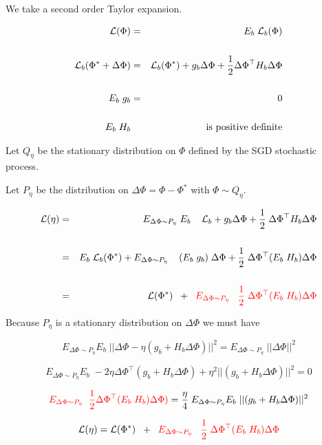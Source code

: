 {\vfill
We take a second order Taylor expansion.

\begin{eqnarray*}
{\cal L}(\Phi) & = & E_b\;{\cal L}_b(\Phi) \\
\\
{\cal L}_b(\Phi^* + \Delta \Phi) & = & {\cal L}_b(\Phi^*) + g_b \Delta \Phi + \frac{1}{2} \Delta\Phi^\top H_b \Delta\Phi \\
\\
E_b\; g_b & = & 0\\
\\
E_b\; H_b & & \mbox{is positive definite}
\end{eqnarray*}


Let $Q_\eta$ be the stationary distribution on $\Phi$ defined by the SGD stochastic process.

\vfill
Let $P_\eta$ be the distribution on $\Delta\Phi = \Phi - \Phi^*$ with $\Phi \sim Q_\eta$.

\begin{eqnarray*}
{\cal L}(\eta) & = & \;\;\; E_{\Delta \Phi \sim P_\eta}\;E_b \;\;\;\; {\cal L}_b + g_b\Delta \Phi + \frac{1}{2}\;\Delta \Phi^\top H_b \Delta \Phi \\
\\
& = & E_b\; {\cal L}_b(\Phi^*) + E_{\Delta \Phi \sim P_\eta} \;\;\;\;(E_b\;g_b) \;\Delta \Phi + \frac{1}{2}\;\Delta \Phi^\top (E_b\; H_b) \Delta \Phi \\
\\
& = & {\cal L}(\Phi^*)\;\; + \;\; {\color{red} E_{\Delta \Phi \sim P_\eta}\;\;\;\frac{1}{2}\;\Delta \Phi^\top (E_b\;H_b) \Delta \Phi}
\end{eqnarray*}

Because $P_\eta$ is a stationary distribution on $\Delta \Phi$ we must have

$$E_{\Delta \Phi \sim P_\eta}E_b\; ||\Delta \Phi - \eta (g_b + H_b\Delta \Phi)||^2 = E_{\Delta \Phi \sim P_\eta}\; ||\Delta \Phi||^2$$

\vfill
$$E_{\Delta \Phi \sim P_\eta}E_b\;-2\eta \Delta \Phi^\top (g_b + H_b\Delta \Phi) +\eta^2||(g_b + H_b\Delta \Phi)||^2 = 0$$

\vfill
$${\color{red} E_{\Delta \Phi \sim P_\eta}\;\;\frac{1}{2}\Delta \Phi^\top (E_b \;H_b)\Delta \Phi)} = \frac{\eta}{4}\;E_{\Delta \Phi \sim P_\eta}E_b \;||(g_b + H_b\Delta \Phi)||^2$$



$${\cal L}(\eta)  = {\cal L}(\Phi^*)\;\; + \;\; {\color{red} E_{\Delta \Phi \sim P_\eta}\;\;\;\frac{1}{2}\;\Delta \Phi^\top (E_b\;H_b) \Delta \Phi}$$

}
